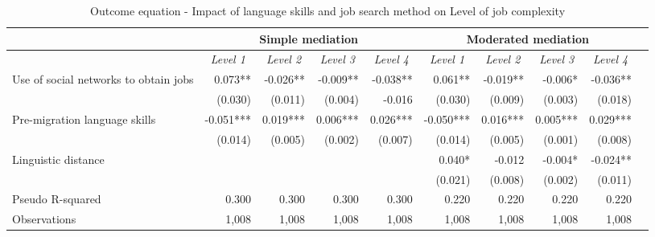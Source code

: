 \documentclass[12pt,a4paper]{article}
\begin{document}
\begin{landscape}


\begin{table}[htbp]
  \centering
  \caption{Outcome equation - Impact of language skills and job search method on Level of job complexity}
    \begin{tabular}{p{7.55em}rrrrrrrrr}
    \toprule
    \toprule
          & \multicolumn{4}{c}{\textbf{Simple mediation}} & \multicolumn{4}{c}{\textbf{Moderated mediation}} \\
    \midrule
          & \multicolumn{1}{c}{\textit{Level 1}} & \multicolumn{1}{c}{\textit{Level 2}} & \multicolumn{1}{c}{\textit{Level 3}} & \multicolumn{1}{c}{\textit{Level 4}} & \multicolumn{1}{c}{\textit{Level 1}} & \multicolumn{1}{c}{\textit{Level 2}} & \multicolumn{1}{c}{\textit{Level 3}} & \multicolumn{1}{c}{\textit{Level 4}} \\
    \multicolumn{1}{p{16em}}{Use of social networks to obtain jobs} & 0.073** & -0.026** & -0.009** & -0.038** & 0.061** & -0.019** & -0.006* & -0.036** \\
          & (0.030) & (0.011) & (0.004) & -0.016 & (0.030) & (0.009) & (0.003) & (0.018) \\
    \multicolumn{1}{p{14em}}{Pre-migration language skills} & -0.051*** & 0.019*** & 0.006*** & 0.026*** & -0.050*** & 0.016*** & 0.005*** & 0.029*** \\
          & (0.014) & (0.005) & (0.002) & (0.007) & (0.014) & (0.005) & (0.001) & (0.008) \\
    \multicolumn{1}{p{14em}}{Linguistic distance} &       &       &       &       & 0.040* & -0.012 & -0.004* & -0.024** \\
          &       &       &       &       & (0.021) & (0.008) & (0.002) & (0.011) \\
    \midrule
     \multicolumn{1}{p{14em}}{Pseudo R-squared} & 0.300 & 0.300 & 0.300 & 0.300 & 0.220 & 0.220 & 0.220 & 0.220 \\
    Observations &            1,008    &            1,008    &            1,008    &            1,008    &            1,008    &            1,008    &            1,008    &            1,008    \\
    \bottomrule
    \end{tabular}%



\end{table}
\end{landscape}
\end{document}
